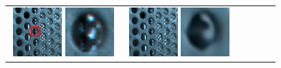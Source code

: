 \begin{figure}[ht!]
{\begin{tabular}{cccccc}
        \begin{minipage}{0.180\textwidth}
            \centering
            \includegraphics[width=0.46\textwidth, height=0.46\textwidth,cfbox=blue 1pt 0pt]{img/qual/Perforated_Metal_3/HR.annotated.png}
            \includegraphics[width=0.46\textwidth, height=0.46\textwidth,cfbox=red 1pt 0pt]{img/qual/Perforated_Metal_3/HR.LAM.png}
        \end{minipage} &
        \begin{minipage}{0.180\textwidth}
            \centering
            \includegraphics[width=0.46\textwidth, height=0.46\textwidth,cfbox=blue 1pt 0pt]{img/qual/Perforated_Metal_3/IINet/SR.png}
            \includegraphics[width=0.46\textwidth, height=0.46\textwidth,cfbox=red 1pt 0pt]{img/qual/Perforated_Metal_3/IINet/SR.LAM.png}

\end{minipage}
\end{tabular}}
\end{figure}
